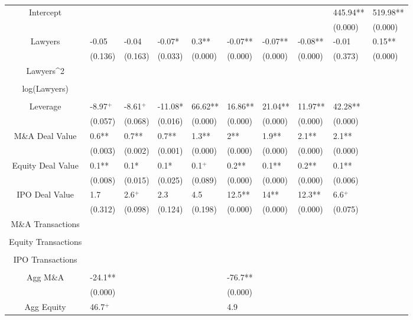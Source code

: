 \documentclass{article}
\begin{document}
\begin{table}[H]
\begin{tabular}{|clllllllll|}
Intercept &  &  &  &  &  &  &  & 445.94** & 519.98** \\ 
   &  &  &  &  &  &  &  & (0.000) & (0.000) \\ 
  Lawyers & -0.05 & -0.04 & -0.07* & 0.3** & -0.07** & -0.07** & -0.08** & -0.01 & 0.15** \\ 
   & (0.136) & (0.163) & (0.033) & (0.000) & (0.000) & (0.000) & (0.000) & (0.373) & (0.000) \\ 
  Lawyers^2 &  &  &  &  &  &  &  &  &  \\ 
   &  &  &  &  &  &  &  &  &  \\ 
  log(Lawyers) &  &  &  &  &  &  &  &  &  \\ 
   &  &  &  &  &  &  &  &  &  \\ 
  Leverage & -8.97$^{+}$ & -8.61$^{+}$ & -11.08* & 66.62** & 16.86** & 21.04** & 11.97** & 42.28** &  \\ 
   & (0.057) & (0.068) & (0.016) & (0.000) & (0.000) & (0.000) & (0.000) & (0.000) &  \\ 
  M\&A Deal Value & 0.6** & 0.7** & 0.7** & 1.3** & 2** & 1.9** & 2.1** & 2.1** &  \\ 
   & (0.003) & (0.002) & (0.001) & (0.000) & (0.000) & (0.000) & (0.000) & (0.000) &  \\ 
  Equity Deal Value & 0.1** & 0.1* & 0.1* & 0.1$^{+}$ & 0.2** & 0.1** & 0.2** & 0.1** &  \\ 
   & (0.008) & (0.015) & (0.025) & (0.089) & (0.000) & (0.000) & (0.000) & (0.006) &  \\ 
  IPO Deal Value & 1.7 & 2.6$^{+}$ & 2.3 & 4.5 & 12.5** & 14** & 12.3** & 6.6$^{+}$ &  \\ 
   & (0.312) & (0.098) & (0.124) & (0.198) & (0.000) & (0.000) & (0.000) & (0.075) &  \\ 
  M\&A Transactions &  &  &  &  &  &  &  &  &  \\ 
   &  &  &  &  &  &  &  &  &  \\ 
  Equity Transactions &  &  &  &  &  &  &  &  &  \\ 
   &  &  &  &  &  &  &  &  &  \\ 
  IPO Transactions &  &  &  &  &  &  &  &  &  \\ 
   &  &  &  &  &  &  &  &  &  \\ 
  Agg M\&A & -24.1** &  &  &  & -76.7** &  &  &  &  \\ 
   & (0.000) &  &  &  & (0.000) &  &  &  &  \\ 
  Agg Equity & 46.7$^{+}$ &  &  &  & 4.9 &  &  &  &  \\ 

\end{tabular}
\end{table}
\end{document}
